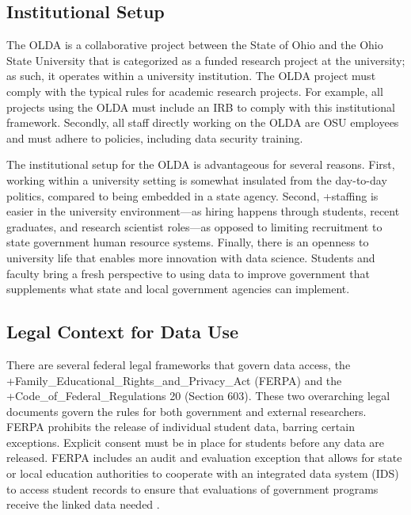 \documentclass[
]{book}
\begin{document}
\hypertarget{institutional-setup-1}{%
\subsection{Institutional Setup}\label{institutional-setup-1}}

The OLDA is a collaborative project between the State of Ohio and the Ohio State University that is categorized as a funded research project at the university; as such, it operates within a university institution. The OLDA project must comply with the typical rules for academic research projects. For example, all projects using the OLDA must include an IRB to comply with this institutional framework. Secondly, all staff directly working on the OLDA are OSU employees and must adhere to policies, including data security training.

The institutional setup for the OLDA is advantageous for several reasons. First, working within a university setting is somewhat insulated from the day-to-day politics, compared to being embedded in a state agency. Second, +staffing\textbar{} is easier in the university environment---as hiring happens through students, recent graduates, and research scientist roles---as opposed to limiting recruitment to state government human resource systems. Finally, there is an openness to university life that enables more innovation with data science. Students and faculty bring a fresh perspective to using data to improve government that supplements what state and local government agencies can implement.

\hypertarget{legal-context-for-data-use-1}{%
\subsection{Legal Context for Data Use}\label{legal-context-for-data-use-1}}

There are several federal legal frameworks that govern data access, the +Family\_Educational\_Rights\_and\_Privacy\_Act\textbar{} (FERPA) and the +Code\_of\_Federal\_Regulations\textbar{} 20 (Section 603). These two overarching legal documents govern the rules for both government and external researchers. FERPA prohibits the release of individual student data, barring certain exceptions. Explicit consent must be in place for students before any data are released. FERPA includes an audit and evaluation exception that allows for state or local education authorities to cooperate with an integrated data system (IDS) to access student records to ensure that evaluations of government programs receive the linked data needed \citep{privacytechnicalassistancecenter2017}.
\end{document}
